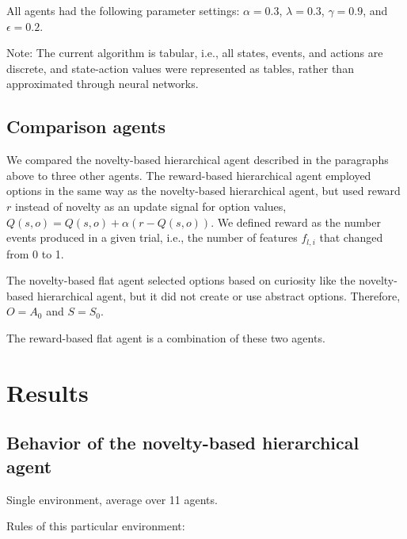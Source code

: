 \documentclass{article}
\begin{document}
All agents had the following parameter settings: $\alpha = 0.3$, $\lambda = 0.3$, $\gamma = 0.9$, and $\epsilon = 0.2$. 

Note: The current algorithm is tabular, i.e., all states, events, and actions are discrete, and state-action values were represented as tables, rather than approximated through neural networks.

\subsection{Comparison agents}

We compared the novelty-based hierarchical agent described in the paragraphs above to three other agents. The reward-based hierarchical agent employed options in the same way as the novelty-based hierarchical agent, but used reward $r$ instead of novelty as an update signal for option values, $Q(s, o) = Q(s, o) + \alpha (r - Q(s, o))$. We defined reward as the number events produced in a given trial, i.e., the number of features $f_{l, i}$ that changed from 0 to 1. 

The novelty-based flat agent selected options based on curiosity like the novelty-based hierarchical agent, but it did not create or use abstract options. Therefore, $O = A_0$ and $S = S_0$. 

The reward-based flat agent is a combination of these two agents.

\section{Results}

\subsection{Behavior of the novelty-based hierarchical agent}

Single environment, average over 11 agents.

Rules of this particular environment:
\end{document}
